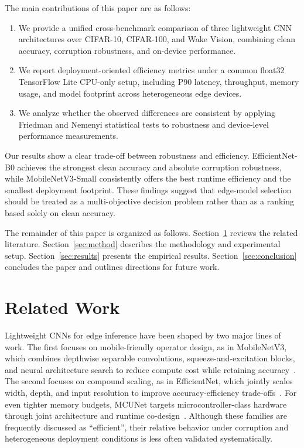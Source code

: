 \documentclass[runningheads]{llncs}
\begin{document}
The main contributions of this paper are as follows:
\begin{enumerate}
    \item We provide a unified cross-benchmark comparison of three lightweight CNN architectures over CIFAR-10, CIFAR-100, and Wake Vision, combining clean accuracy, corruption robustness, and on-device performance.
    \item We report deployment-oriented efficiency metrics under a common float32 TensorFlow Lite CPU-only setup, including P90 latency, throughput, memory usage, and model footprint across heterogeneous edge devices.
    \item We analyze whether the observed differences are consistent by applying Friedman and Nemenyi statistical tests to robustness and device-level performance measurements.
\end{enumerate}

Our results show a clear trade-off between robustness and efficiency. EfficientNet-B0 achieves the strongest clean accuracy and absolute corruption robustness, while MobileNetV3-Small consistently offers the best runtime efficiency and the smallest deployment footprint. These findings suggest that edge-model selection should be treated as a multi-objective decision problem rather than as a ranking based solely on clean accuracy.

The remainder of this paper is organized as follows. Section~\ref{sec:related} reviews the related literature. Section~\ref{sec:method} describes the methodology and experimental setup. Section~\ref{sec:results} presents the empirical results. Section~\ref{sec:conclusion} concludes the paper and outlines directions for future work.

\section{Related Work}
\label{sec:related}
Lightweight CNNs for edge inference have been shaped by two major lines of work. The first focuses on mobile-friendly operator design, as in MobileNetV3, which combines depthwise separable convolutions, squeeze-and-excitation blocks, and neural architecture search to reduce compute cost while retaining accuracy~\cite{howard2019mobilenetv3}. The second focuses on compound scaling, as in EfficientNet, which jointly scales width, depth, and input resolution to improve accuracy-efficiency trade-offs~\cite{tan2019efficientnet}. For even tighter memory budgets, MCUNet targets microcontroller-class hardware through joint architecture and runtime co-design~\cite{lin2020mcunet}. Although these families are frequently discussed as ``efficient'', their relative behavior under corruption and heterogeneous deployment conditions is less often validated systematically.
\end{document}
